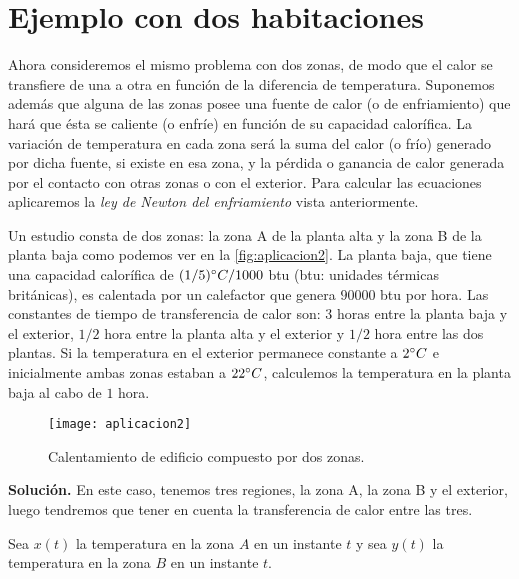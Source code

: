 \section{Ejemplo con dos habitaciones}
Ahora consideremos el mismo problema con dos zonas, de modo que el calor se transfiere de una a otra en función de la diferencia de temperatura. Suponemos además que alguna de las zonas posee una fuente de calor (o de enfriamiento) que hará que ésta se caliente (o enfríe) en función de su capacidad calorífica. La variación de temperatura en cada zona será la suma del calor (o frío) generado por dicha fuente, si existe en esa zona, y la pérdida o ganancia de calor generada por el contacto con otras zonas o con el exterior. Para calcular las ecuaciones aplicaremos la \textit{ley de Newton del enfriamiento} vista anteriormente.
\begin{ejemplo}
	Un estudio consta de dos zonas: la zona A de la planta alta y la zona B de la planta baja como podemos ver en la \autoref{fig:aplicacion2}. La planta baja, que tiene una capacidad calorífica de $(1/5)\degree C /1000$ btu (btu: unidades térmicas británicas), es calentada por un calefactor que genera $90000$ btu por hora. Las constantes de tiempo de transferencia de calor son: $3$ horas entre la planta baja y el exterior, $1/2$ hora entre la planta alta y el exterior y $1/2$ hora entre las dos plantas. Si la temperatura en el exterior permanece constante a $2\degree C$ e inicialmente ambas zonas estaban a $22\degree C$, calculemos la temperatura en la planta baja al cabo de $1$ hora.
	
	\begin{figure}[h!]
		\centering
		\texttt{[image: aplicacion2]}
		\caption{Calentamiento de edificio compuesto por dos zonas.}
		\label{fig:aplicacion2}
	\end{figure}
	\textbf{Solución.} En este caso, tenemos tres regiones, la zona A, la zona B y el exterior, luego tendremos que tener en cuenta la transferencia de calor entre
	las tres.
	
	Sea $x(t)$ la temperatura en la zona $A$ en un instante $t$ y sea $y(t)$ la temperatura en la zona $B$ en un instante $t$.
	

\end{ejemplo}
